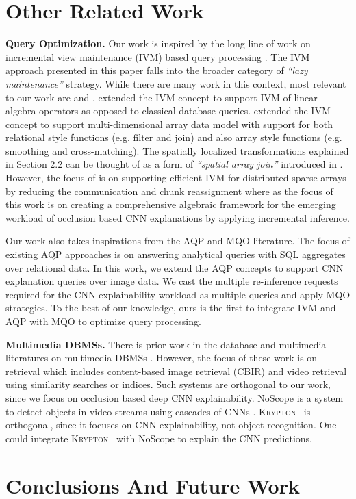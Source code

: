 \documentclass[10pt, sigconf]{acmart}
\newcommand{\system}{\textsc{Krypton}}
\begin{document}


\section{Other Related Work}

\vspace{2mm}
\noindent \textbf{Query Optimization.} Our work is inspired by the long line of work on incremental view maintenance (IVM) based query processing \cite{chirkova2012materialized,gupta1995maintenance,levy1995answering}.
The IVM approach presented in this paper falls into the broader category of \textit{``lazy maintenance''} strategy.
While there are many work in this context, most relevant to our work are \cite{nikolic2014linview} and \cite{zhao2017incremental}.
\cite{nikolic2014linview} extended the IVM concept to support IVM of linear algebra operators as opposed to classical database queries.
\cite{zhao2017incremental} extended the IVM concept to support multi-dimensional array data model with support for both relational style functions (e.g. filter and join) and also array style functions (e.g. smoothing and cross-matching).
The spatially localized transformations explained in Section 2.2 can be thought of as a form of \textit{``spatial array join''} introduced in \cite{zhao2017incremental}.
However, the focus of \cite{zhao2017incremental} is on supporting efficient IVM for distributed sparse arrays by reducing the communication and chunk reassignment where as the focus of this work is on creating a comprehensive algebraic framework for the emerging workload of occlusion based  CNN explanations by applying incremental inference.

Our work also takes inspirations from the AQP \cite{mozafari2017approximate,park2018verdictdb,garofalakis2001approximate} and MQO \cite{sellis1988multiple,le2012scalable} literature.
The focus of existing AQP approaches is on answering analytical queries with SQL aggregates over relational data.
In this work, we extend the AQP concepts to support CNN explanation queries over image data.
We cast the multiple re-inference requests required for the CNN explainability workload as multiple queries and apply MQO strategies.
To the best of our knowledge, ours is the first to integrate IVM and AQP with MQO to optimize query processing.


\vspace{2mm}
\noindent \textbf{Multimedia DBMSs.} There is prior work in the database and multimedia literatures on multimedia DBMSs \cite{adjeroh1997multimedia,kalipsiz2000multimedia}.
However, the focus of these work is on retrieval which includes content-based image retrieval (CBIR) and video retrieval using similarity searches or indices.
Such systems are orthogonal to our work, since we focus on occlusion based deep CNN explainability.
NoScope is a system to detect objects in video streams using cascades of CNNs \cite{kang2017noscope}.
\system~ is orthogonal, since it focuses on CNN explainability, not object recognition.
One could integrate \system~ with NoScope to explain the CNN predictions.


\section{Conclusions And Future Work}





\end{document}
